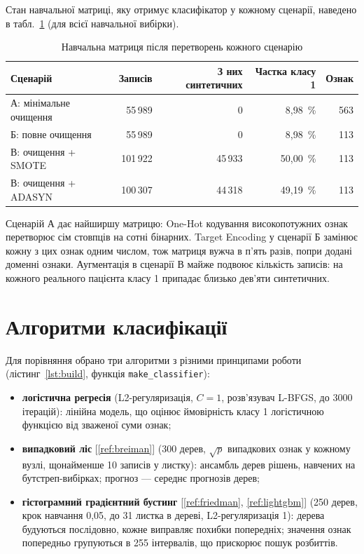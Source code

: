 \documentclass[14pt,a4paper]{extreport}
\begin{document}
Стан навчальної матриці, яку отримує класифікатор у кожному сценарії, наведено в табл.~\ref{tab:profiles} (для всієї навчальної вибірки).

\begin{table}[H]
\caption{Навчальна матриця після перетворень кожного сценарію}
\label{tab:profiles}
\begin{tabularx}{\linewidth}{|X|r|r|r|r|}
\hline
\textbf{Сценарій} & \textbf{Записів} & \textbf{З них синтетичних} & \textbf{Частка класу 1} & \textbf{Ознак} \\
\hline
А: мінімальне очищення & 55\,989 & 0 & 8,98~\% & 563 \\
\hline
Б: повне очищення & 55\,989 & 0 & 8,98~\% & 113 \\
\hline
В: очищення + SMOTE & 101\,922 & 45\,933 & 50,00~\% & 113 \\
\hline
В: очищення + ADASYN & 100\,307 & 44\,318 & 49,19~\% & 113 \\
\hline
\end{tabularx}
\end{table}

Сценарій А дає найширшу матрицю: One-Hot кодування високопотужних ознак перетворює сім стовпців на сотні бінарних. Target Encoding у сценарії Б замінює кожну з цих ознак одним числом, тож матриця вужча в п'ять разів, попри додані доменні ознаки. Аугментація в сценарії В майже подвоює кількість записів: на кожного реального пацієнта класу 1 припадає близько дев'яти синтетичних.

\section{Алгоритми класифікації}
\label{sec:models}

Для порівняння обрано три алгоритми з різними принципами роботи (лістинг~\ref{lst:build}, функція \texttt{make\_classifier}):

\begin{itemize}
\item \textbf{логістична регресія} (L2-регуляризація, $C = 1$, розв'язувач L-BFGS, до 3000 ітерацій): лінійна модель, що оцінює ймовірність класу 1 логістичною функцією від зваженої суми ознак;
\item \textbf{випадковий ліс} [\ref{ref:breiman}] (300 дерев, $\sqrt{p}$ випадкових ознак у кожному вузлі, щонайменше 10 записів у листку): ансамбль дерев рішень, навчених на бутстреп-вибірках; прогноз --- середнє прогнозів дерев;
\item \textbf{гістограмний градієнтний бустинг} [\ref{ref:friedman}, \ref{ref:lightgbm}] (250 дерев, крок навчання 0,05, до 31 листка в дереві, L2-регуляризація 1): дерева будуються послідовно, кожне виправляє похибки попередніх; значення ознак попередньо групуються в 255 інтервалів, що прискорює пошук розбиттів.
\end{itemize}
\end{document}
